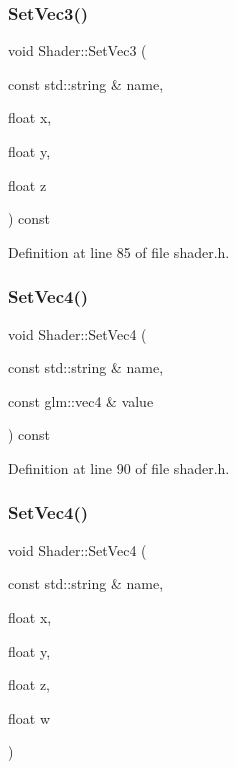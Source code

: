 \subsubsection{\texorpdfstring{SetVec3()}{SetVec3()}\hspace{0.1cm}{\footnotesize\ttfamily [2/2]}}
{\footnotesize\ttfamily void Shader\+::\+Set\+Vec3 (\begin{DoxyParamCaption}\item[{const std\+::string \&}]{name,  }\item[{float}]{x,  }\item[{float}]{y,  }\item[{float}]{z }\end{DoxyParamCaption}) const\hspace{0.3cm}{\ttfamily [inline]}}



Definition at line 85 of file shader.\+h.

\mbox{\label{class_shader_a12c2843859a8c0f26d8342ef17b4355c}} 
\subsubsection{\texorpdfstring{SetVec4()}{SetVec4()}\hspace{0.1cm}{\footnotesize\ttfamily [1/2]}}
{\footnotesize\ttfamily void Shader\+::\+Set\+Vec4 (\begin{DoxyParamCaption}\item[{const std\+::string \&}]{name,  }\item[{const glm\+::vec4 \&}]{value }\end{DoxyParamCaption}) const\hspace{0.3cm}{\ttfamily [inline]}}



Definition at line 90 of file shader.\+h.

\mbox{\label{class_shader_aa22b708c2c588f8064a7dc729dccd4ac}} 
\subsubsection{\texorpdfstring{SetVec4()}{SetVec4()}\hspace{0.1cm}{\footnotesize\ttfamily [2/2]}}
{\footnotesize\ttfamily void Shader\+::\+Set\+Vec4 (\begin{DoxyParamCaption}\item[{const std\+::string \&}]{name,  }\item[{float}]{x,  }\item[{float}]{y,  }\item[{float}]{z,  }\item[{float}]{w }\end{DoxyParamCaption})\hspace{0.3cm}{\ttfamily [inline]}}



